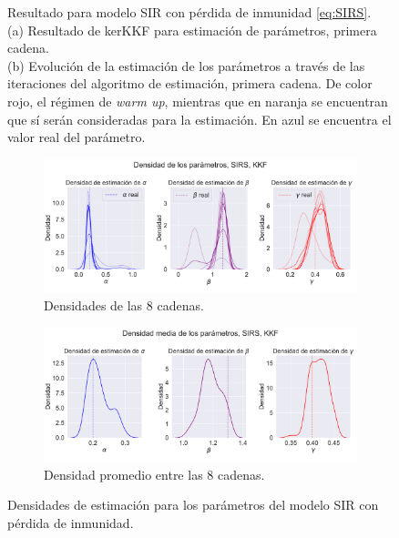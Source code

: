 \begin{figure}[h!]
\begin{subfigure}[b]{0.49\textwidth}
         \caption{}
         \label{fig:nonlinear_filters_sirs_params_evolution}
    \end{subfigure}
    \caption{Resultado para modelo SIR con pérdida de inmunidad \eqref{eq:SIRS}. \\
    (a) Resultado de kerKKF para estimación de parámetros, primera cadena. \\
    (b) Evolución de la estimación de los parámetros a través de las iteraciones del algoritmo de estimación, primera cadena. De color rojo, el régimen de \textit{warm up}, mientras que en naranja se encuentran que sí serán consideradas para la estimación. En azul se encuentra el valor real del parámetro.}
    \label{fig:SIR_inmun}
\end{figure}

\begin{figure}[h]
    \centering
    \begin{subfigure}[b]{0.8\textwidth}
        \centering \includegraphics[width=0.8\linewidth]{img/content/chapter4/nonlinear_filters_sirs_params_density.pdf}
    \caption{Densidades de las 8 cadenas.}
    \label{fig:nonlinear_filters_sirs_params_density}
    \end{subfigure}
    \begin{subfigure}[b]{0.8\textwidth}
        \centering \includegraphics[width=0.8\linewidth]{img/content/chapter4/nonlinear_filters_sirs_params_density_mean.pdf}
    \caption{Densidad promedio entre las 8 cadenas.}
    \label{fig:nonlinear_filters_sirs_params_density_mean}
    \end{subfigure}
    \caption{Densidades de estimación para los parámetros del modelo SIR con pérdida de inmunidad.}
\end{figure}


